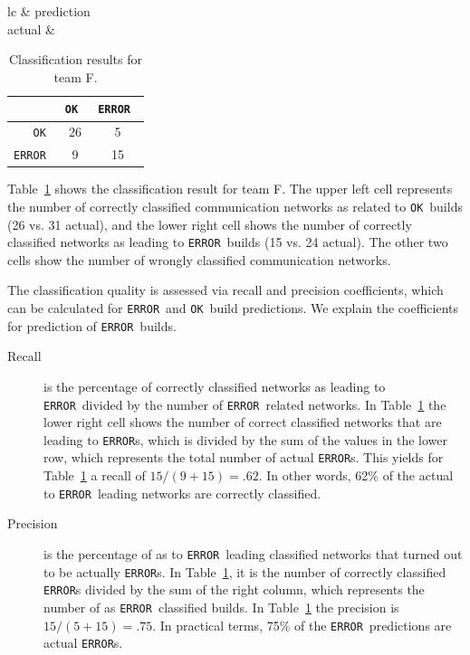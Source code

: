 \documentclass[12pt,oneside]{book}
\newcommand\error{\texttt{ERROR}}
\newcommand\ok{\texttt{OK}}
\begin{document}
\begin{table}[t] \centering\small
\begin{tabular}{lc}
& prediction \\
actual & 
\begin{tabular}{r|c|c|}
& \ok\ & \error\ \\\hline
\ok\ & 26 & 5 \\\hline
\error\ & 9 & 15 \\\hline
\end{tabular}
\end{tabular}
\caption{Classification results for team F.}
\label{tab:cont}
\end{table}

Table~\ref{tab:cont} shows the classification result for team F. The upper left
cell represents the number of correctly classified communication networks as
related to \ok\ builds (26 vs. 31 actual), and the lower right cell shows the
number of correctly classified networks as leading to \error\ builds (15 vs. 24
actual). The other two cells show the number of wrongly classified communication
networks.

The classification quality is assessed via recall and precision coefficients,
which can be calculated for \error\ and \ok\ build  predictions. We explain the
coefficients for prediction of \error\ builds.

\begin{description}
\item[Recall] is the percentage of correctly classified networks as leading to
\error\ divided by the number of \error\ related networks. In
Table~\ref{tab:cont} the lower right cell shows the number of correct classified
networks that are leading to \error s, which is divided by the sum of the values
in the lower row, which represents the total number of actual \error s. This
yields for Table~\ref{tab:cont} a recall of $15/(9+15)=.62$. In other words,
62\% of the actual to \error\ leading networks are correctly classified.
 
\item[Precision] is the percentage of as to \error\ leading classified networks
that turned out to be actually \error s. In Table~\ref{tab:cont}, it is the
number of correctly classified \error s divided by the sum of the right column,
which represents the number of as \error\ classified builds. In
Table~\ref{tab:cont} the precision is $15/(5+15)=.75$. In practical terms, 75\%
of the \error\ predictions are actual \error s.
\end{description}
\end{document}
